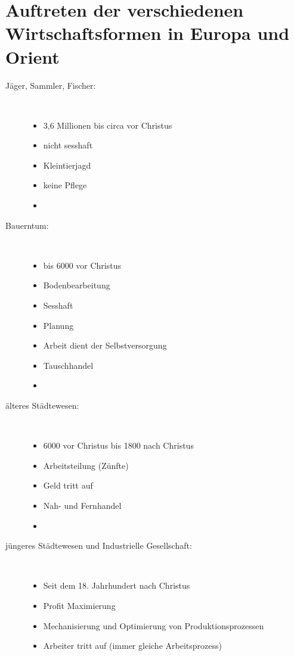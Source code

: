 \section{Auftreten der verschiedenen Wirtschaftsformen in Europa und Orient}
\begin{description}
	\item[Jäger, Sammler, Fischer:]~
	\begin{itemize}
		\item 3,6 Millionen bis circa  vor Christus
		\item nicht sesshaft
		\item Kleintierjagd
		\item keine Pflege
		\item {} 
	\end{itemize}
	\item[Bauerntum:]~
	\begin{itemize}
		\item {} bis 6000 vor Christus
		\item Bodenbearbeitung
		\item Sesshaft
		\item Planung
		\item Arbeit dient der Selbstversorgung
		\item Tauschhandel
		\item {} 
	\end{itemize}
	\item[älteres Städtewesen:]~
	\begin{itemize}
		\item 6000 vor Christus bis 1800 nach Christus
		\item Arbeitsteilung (Zünfte)
		\item Geld tritt auf
		\item Nah- und Fernhandel
		\item {} 
	\end{itemize}
	\item[jüngeres Städtewesen und Industrielle Gesellschaft:]~
	\begin{itemize}
		\item Seit dem 18. Jahrhundert nach Christus
		\item Profit Maximierung
		\item Mechanisierung und Optimierung von Produktionsprozessen
		\item Arbeiter tritt auf (immer gleiche Arbeitsprozess)

\end{itemize}
\end{description}
